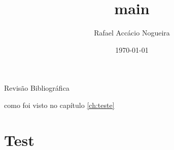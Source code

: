\documentclass[presentation]{beamer}
\author{Rafael Accácio Nogueira}
\date{\today}
\title{main}
\begin{document}
\maketitle
\tableofcontents


\begin{frame}{Revisão Bibliográfica}

como foi visto no capítulo \ref{ch:teste}
\end{frame}


\section{Test}
\label{sec-1}
\end{document}

